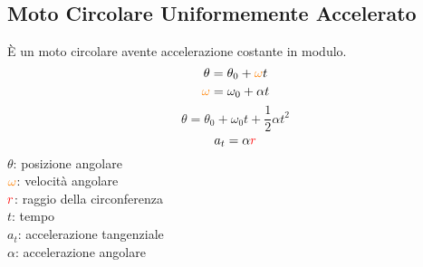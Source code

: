 \subsection{Moto Circolare Uniformemente Accelerato}\label{subsec:cinematica:mrua}
È un moto circolare avente accelerazione costante in modulo.
\begin{equation*}
  \theta = \theta_0 + \mathcolor{orange}{\omega}t
\end{equation*}
\begin{equation*}
  \mathcolor{orange}{\omega} = \omega_0 + \alpha t
\end{equation*}
\begin{equation*}
  \theta = \theta_0 + \omega_0t + \frac{1}{2}\alpha t^2
\end{equation*}
\begin{equation*}
  a_t = \alpha \mathcolor{red}{r}
\end{equation*}
$\theta$: posizione angolare\\
$\mathcolor{orange}{\omega}$: velocità angolare\\
$\mathcolor{red}{r}$: raggio della circonferenza\\
$t$: tempo\\
$a_t$: accelerazione tangenziale\\
$\alpha$: accelerazione angolare
